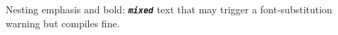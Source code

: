 \documentclass{article}
\begin{document}
Nesting emphasis and bold: \textbf{\textit{\texttt{mixed}}} text that may
trigger a font-substitution warning but compiles fine.
\end{document}
